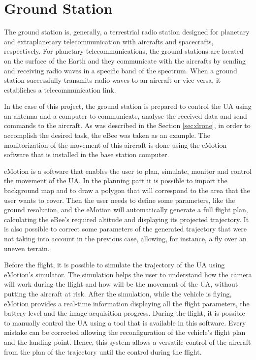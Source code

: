 \section{Ground Station}\label{sec:gs}

The ground station is, generally, a terrestrial radio station designed for planetary and extraplanetary telecommunication with aircrafts and spacecrafts, respectively. For planetary telecommunications, the ground stations are located on the surface of the Earth and they communicate with the aircrafts by sending and receiving radio waves in a specific band of the spectrum. When a ground station successfully transmits radio waves to an aircraft or vice versa, it establiches a telecommunication link.

In the case of this project, the ground station is prepared to control the UA using an antenna and a computer to communicate, analyse the received data and send commands to the aircraft. As was described in the Section \ref{sec:drone}, in order to accomplish the desired task, the eBee was taken as an example. The monitorization of the movement of this aircraft is done using the eMotion software that is installed in the base station computer.

eMotion is a software that enables the user to plan, simulate, monitor and control the movement of the UA. In the planning part it is possible to import the background map and to draw a polygon that will correspond to the area that the user wants to cover. Then the user needs to define some parameters, like the ground resolution, and the eMotion will automatically generate a full flight plan, calculating the eBee’s required altitude and displaying its projected trajectory. It is also possible to correct some parameters of the generated trajectory that were not taking into account in the previous case, allowing, for instance, a fly over an uneven terrain.

Before the flight, it is possible to simulate the trajectory of the UA using eMotion's simulator. The simulation helps the user to understand how the camera will work during the flight and how will be the movement of the UA, without putting the aircraft at risk. After the simulation, while the vehicle is flying, eMotion provides a real-time information displaying all the flight parameters, the battery level and the image acquisition progress. During the flight, it is possible to manually control the UA using a tool that is available in this software. Every mistake can be corrected allowing the reconfiguration of the vehicle's flight plan and the landing point. Hence, this system allows a versatile control of the aircraft from the plan of the trajectory until the control during the flight.